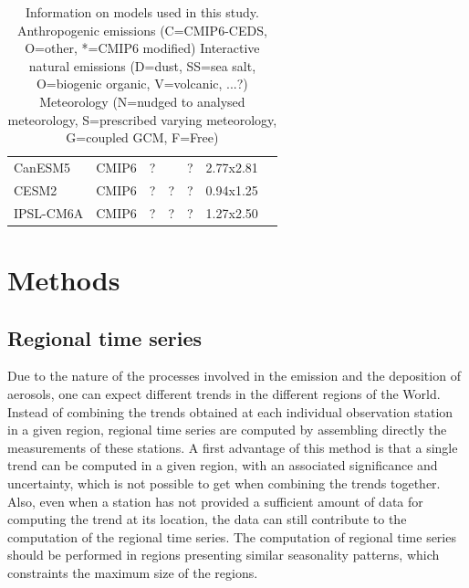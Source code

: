 \documentclass[journal abbreviation, manuscript]{copernicus}
\begin{document}
\begin{table}[]
\begin{tabularx}{\textwidth}{llllllX}
  CanESM5    & CMIP6     & ?                          &                            & ?           & 2.77x2.81                  & \cite{gmd-12-4823-2019}                                             \\
  CESM2      & CMIP6     & ?                          & ?                          & ?           & 0.94x1.25                  &                                                                     \\
  IPSL-CM6A  & CMIP6     & ?                          & ?                          & ?           & 1.27x2.50                  &                                                                     \\ \bottomrule
 \end{tabularx}
 \caption{Information on models used in this study.
  Anthropogenic emissions (C=CMIP6-CEDS, O=other, *=CMIP6 modified)
  Interactive natural emissions (D=dust, SS=sea salt, O=biogenic organic, V=volcanic, ...?)
  Meteorology (N=nudged to analysed meteorology, S=prescribed varying meteorology, G=coupled GCM, F=Free)
 }
 \label{table:models}
\end{table}



\section{Methods}

\subsection{Regional time series}
Due to the nature of the processes involved in the emission and the deposition of aerosols, one can expect different trends in the different regions of the World. Instead of combining the trends obtained at each individual observation station in a given region, regional time series are computed by assembling directly the measurements of these stations. A first advantage of this method is that a single trend can be computed in a given region, with an associated significance and uncertainty, which is not possible to get when combining the trends together. Also, even when a station has not provided a sufficient amount of data for computing the trend at its location, the data can still contribute to the computation of the regional time series. The computation of regional time series should be performed in regions presenting similar seasonality patterns, which constraints the maximum size of the regions.
\end{document}
